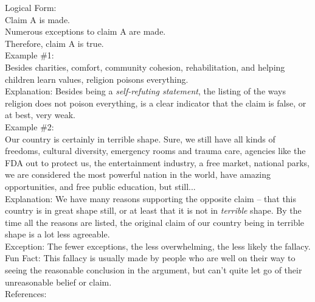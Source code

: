 \documentclass[a4paper,12pt,single,pdftex]{scrbook}
\begin{document}
    
      Logical Form:
    \\

    
      Claim A is made.
    \\

    
      Numerous exceptions to claim A are made.
    \\

    
      Therefore, claim A is true.
    \\

    
      Example \#1:
    \\

    
      Besides charities, comfort, community cohesion, rehabilitation, and helping children learn values, religion poisons everything.
    \\

    
      Explanation: Besides being a {\it self-refuting statement}, the listing of the ways religion does not poison everything, is a clear indicator that the claim is false, or at best, very weak.
    \\

    
      Example \#2:
    \\

    
      Our country is certainly in terrible shape.  Sure, we still have all kinds of freedoms, cultural diversity, emergency rooms and trauma care, agencies like the FDA out to protect us, the entertainment industry, a free market, national parks, we are considered the most powerful nation in the world, have amazing opportunities, and free public education, but still...
    \\

    
      Explanation: We have many reasons supporting the opposite claim -- that this country is in great shape still, or at least that it is not in {\it terrible}  shape.  By the time all the reasons are listed, the original claim of our country being in terrible shape is a lot less agreeable.
    \\

    
      Exception: The fewer exceptions, the less overwhelming, the less likely the fallacy.
    \\

    
      Fun Fact: This fallacy is usually made by people who are well on their way to seeing the reasonable conclusion in the argument, but can’t quite let go of their unreasonable belief or claim.
    \\

    References:
\end{document}
